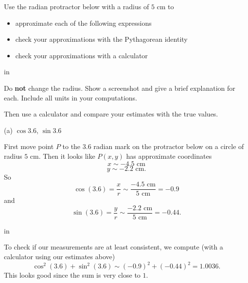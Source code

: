 \documentclass{ximera}
\newcommand{\pskip}{\vskip 0.1 in}
\begin{document}
\begin{question}\label{Exp1:CF}
Use the radian protractor below with a radius of $5$ cm to 
\begin{itemize}

\item{approximate each of the following expressions}

\item{check your approximations with the Pythagorean identity}

\item{check your approximations with a calculator}
\end{itemize}

\pskip

 Do {\bf not} change the radius. Show a screenshot and give a brief explanation for each. Include all units in your computations. 



Then use a calculator and compare your estimates with the true values.

(a) $\cos 3.6$, $\sin 3.6$  %

\begin{explanation}
First move point $P$ to the $3.6$ radian mark on the protractor below on a circle of radius $5$ cm. Then it looks like $P(x,y)$ has approximate coordinates
\[
     x \sim -4.5 \text{ cm}
\]
\[
    y \sim -2.2 \text{ cm} .
\]
So 
\[
   \cos (3.6) = \frac{x}{r} \sim \frac{-4.5 \text{ cm}}{5 \text{ cm}} = -0.9
\]
and 
\[
   \sin (3.6) = \frac{y}{r} \sim \frac{-2.2 \text{ cm}}{5 \text{ cm}} = -0.44 .
\]

 
\begin{onlineOnly}
    \begin{center}
\end{center}
\end{onlineOnly}


\pskip

To check if our measurements are at least consistent, we compute (with a calculator using our estimates above)
\[
   \cos^2 (3.6) + \sin^2 (3.6) \sim (-0.9)^2 + (-0.44)^2  = 1.0036 . 
\]
This looks good since the sum is very close to $1$.


\end{explanation}
\end{question}
\end{document}
